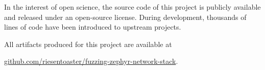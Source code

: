 \documentclass{article}
\begin{document}
\vspace{30px}
\begin{center}
  \begin{minipage}{0.65\textwidth}
    \centering
    In the interest of open science, the source code of this project is publicly available and released under an open-source license. During development, thousands of lines of code have been introduced to upstream projects.

    All artifacts produced for this project are available at

    \vspace{8px}

    \href{https://github.com/riesentoaster/fuzzing-zephyr-network-stack}{github.com/riesentoaster/fuzzing-zephyr-network-stack}.
  \end{minipage}
\end{center}

\vspace{50px}

\end{document}
